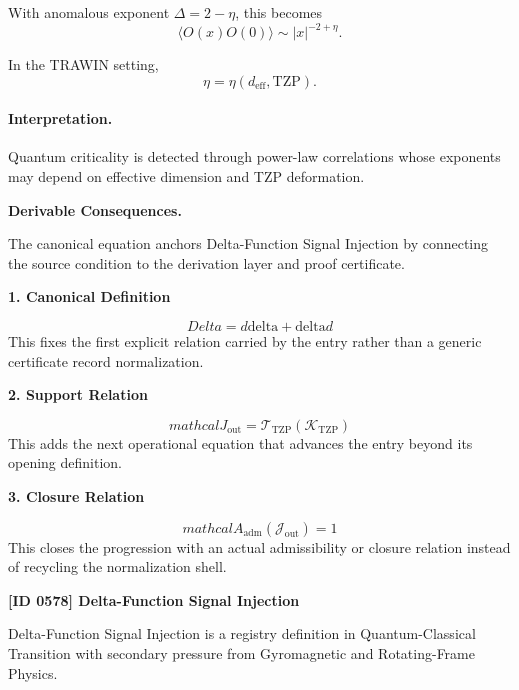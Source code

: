 With anomalous exponent $\Delta=2-\eta$, this becomes
\begin{equation}
\boxed{
\langle O(x)O(0)\rangle
\sim
|x|^{-2+\eta}.
}
\end{equation}

In the TRAWIN setting,
\begin{equation}
\eta=\eta(d_{\mathrm{eff}},\mathrm{TZP}).
\end{equation}

\paragraph{Interpretation.}
Quantum criticality is detected through power-law correlations whose exponents may depend on effective dimension and TZP deformation.

\par\vspace{0.35em}
\noindent\textbf{Derivable Consequences.}\quad
\begingroup
\footnotesize
\raggedright
The canonical equation anchors Delta-Function Signal Injection by connecting the source condition to the derivation layer and proof certificate.
\par\endgroup

\noindent\textbf{1. Canonical Definition}\par
\[
Delta = d\mathrm{delta} + \mathrm{delta} d
\]
\noindent This fixes the first explicit relation carried by the entry rather than a generic certificate record normalization.\par
\noindent\textbf{2. Support Relation}\par
\[
mathcal{J}_{\mathrm{out}} = \mathcal{T}_{\mathrm{TZP}}\!\left(\mathcal{K}_{\mathrm{TZP}}\right)
\]
\noindent This adds the next operational equation that advances the entry beyond its opening definition.\par
\noindent\textbf{3. Closure Relation}\par
\[
mathcal{A}_{\mathrm{adm}}\!\left(\mathcal{J}_{\mathrm{out}}\right)=1
\]
\noindent This closes the progression with an actual admissibility or closure relation instead of recycling the normalization shell.\par

\clearpage
\noindent\textbf{[ID 0578] Delta-Function Signal Injection}\par
\vspace{0.35em}
\begingroup\small
{}
Delta-Function Signal Injection is a registry definition in Quantum-Classical Transition with secondary pressure from Gyromagnetic and Rotating-Frame Physics.

